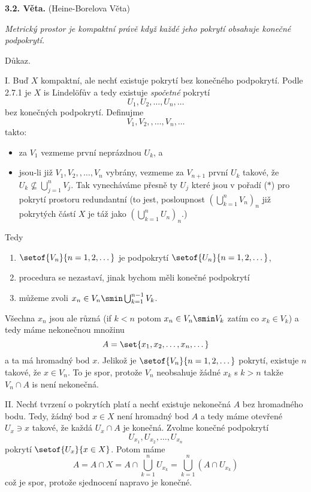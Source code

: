 \documentclass[12pt]{article}
\begin{document}
 {\bf 3.2. Věta.} (Heine-Borelova Věta) {\em Metrický prostor je kompaktní právě když každé jeho pokrytí obsahuje konečné podpokrytí.
 
 Důkaz.} I. Buď $X$ kompaktní, ale nechť existuje pokrytí bez konečného podpokrytí. Podle 2.7.1  je $X$ is 
Lindel\"ofův  a tedy existuje {\em spočetné} pokrytí 
 \begin{equation}
 U_1,U_2,\dots, U_n,\dots \tag{$*$}
 \end{equation}
 bez konečných podpokrytí. Definujme
 $$
 V_1,V_2,,\dots, V_n,\dots
 $$
takto:
\begin{itemize}
\item za $V_1$ vezmeme první neprázdnou $U_k$, a
\item jsou-li již $V_1,V_2,,\dots, V_n$ vybrány, vezmeme za  $V_{n+1}$ první $U_k$ takové, že $U_k\nsubseteq \bigcup_{j=1}^nV_j$. Tak vynecháváme přesně ty $U_j$ které jsou v pořadí ($*$) pro pokrytí prostoru redundantní (to jest, posloupnost $(\bigcup_{k=1}^nV_n)_n$ již pokrytých částí $X$ je táž jako $(\bigcup_{k=1}^nU_n)_n$.)
\end{itemize}
 Tedy
 \begin{enumerate}
 \item $\setof{V_n}{n=1,2,\dots}$ je podpokrytí $\setof{U_n}{n=1,2,\dots}$,  
 \item procedura se nezastaví, jinak bychom měli konečné podpokrytí
 \item můžeme zvoli $x_n\in V_n\smin\bigcup_{k=1}^{n-1}V_k$.
 \end{enumerate}
  Všechna $x_n$ jsou ale různá (if $k<n$ potom $x_n\in V_n\smin V_k$ zatím co $x_k\in V_k$) a tedy máme nekonečnou množinu
  $$
  A=\set{x_1,x_2,\dots,x_n,\dots}
  $$
  a ta má hromadný bod $x$. Jelikož je $\setof{V_n}{n=1,2,\dots}$ pokrytí, existuje $n$ takové, že $x\in V_n$. To je spor, protože  $V_n$ neobsahuje žádné $x_k$ s $k>n$ takže $V_n\cap A$ is není nekonečná.
  
  \smallskip
  
  II. Nechť tvrzení o pokrytích platí a nechť existuje nekonečná $A$ bez hromadného bodu. Tedy, žádný bod $x\in X$ není hromadný bod $A$ a tedy máme otevřené $U_x\ni x$ takové, že každá $U_x\cap A$ je konečná. Zvolme konečné podpokrytí
  $$
  U_{x_1},U_{x_2},\dots, U_{x_n}
  $$
 pokrytí $\setof{U_x}{x\in X}$. Potom máme
  $$
  A=A\cap X=A\cap\bigcup_{k=1}^nU_{x_k}=\bigcup_{k=1}^n(A\cap U_{x_k})
  $$
  což je spor, protože sjednocení napravo je konečné. \sq
  
  \bigskip
  
\end{document}
